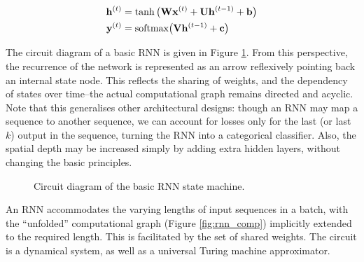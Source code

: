 \documentclass[11pt]{amsart}
\begin{document}
\begin{align}
\mathbf{h}^{(t)} &= \tanh\big(\mathbf{W}\mathbf{x}^{(t)} + \mathbf{U}\mathbf{h}^{(t-1)} + \mathbf{b}\big)\notag \\
\mathbf{y}^{(t)} &= \text{softmax}\big(\mathbf{V}\mathbf{h}^{(t-1)} + \mathbf{c}\big) \notag
\end{align}

The circuit diagram of a basic RNN is given in Figure \ref{fig:rnn_circuit}. From this perspective, the recurrence of the network is represented as an arrow reflexively pointing back an internal state node. This reflects the sharing of weights, and the dependency of states over time--the actual computational graph remains directed and acyclic. Note that this generalises other architectural designs: though an RNN may map a sequence to another sequence, we can account for losses only for the last (or last $k$) output in the sequence, turning the RNN into a categorical classifier. Also, the spatial depth may be increased simply by adding extra hidden layers, without changing the basic principles.

\begin{figure}
\centering
{}
\caption{Circuit diagram of the basic RNN state machine.}
\label{fig:rnn_circuit}
\end{figure}

An RNN accommodates the varying lengths of input sequences in a batch, with the ``unfolded'' computational graph (Figure \ref{fig:rnn_comp}) implicitly extended to the required length. This is facilitated by the set of shared weights. The circuit is a dynamical system, as well as a universal Turing machine approximator.
\end{document}
